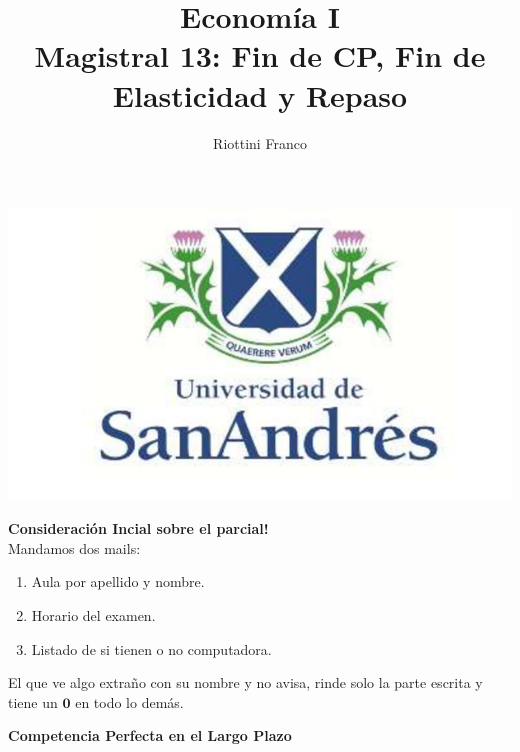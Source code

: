 \documentclass{beamer}
\title[Economía I]{Economía I \vspace{4mm}
\\ Magistral 13: Fin de CP, Fin de Elasticidad y Repaso}
\date{}
\author[Franco Riottini]{Riottini Franco}
\institute[]{Universidad de San Andrés}
\begin{document}
\begin{frame}
    \titlepage
    \centering
    \includegraphics[scale=0.2]{../Figures/logoUDESA.jpg} 
\end{frame}

\begin{frame}
    \centering
    \begin{boxB}
    \centering \Large \textbf{Consideración Incial sobre el parcial!} \\   
    Mandamos dos mails:
    \begin{enumerate}
        \item Aula por apellido y nombre.
        \item Horario del examen.
        \item Listado de si tienen o no computadora.
    \end{enumerate}
    El que ve algo extraño con su nombre y no avisa, rinde solo la parte escrita y tiene un  $\mathbf{0}$ en todo lo demás.
    \end{boxB}
\end{frame}

\begin{frame}
    \centering
    \begin{boxB}
    \centering \Large \textbf{Competencia Perfecta en el Largo Plazo} \\   
    \end{boxB}
\end{frame}
\end{document}
